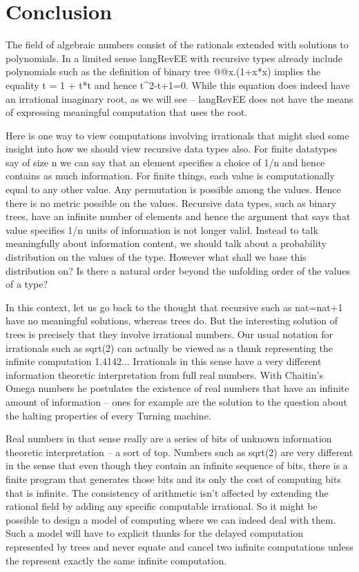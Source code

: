 \documentclass[preprint]{sigplanconf}
\begin{document}
{%
\section{Conclusion}
\label{sec:conc}

The field of algebraic numbers consist of the rationals extended with
solutions to polynomials. In a limited sense {{langRevEE}} with
recursive types already include polynomials such as the definition of
binary tree {{@@x.(1+x*x)}} implies the equality {{t = 1 + t*t}} and
hence {{t^2-t+1=0}}. While this equation does indeed have an
irrational imaginary root, as we will see -- {{langRevEE}} does not
have the means of expressing meaningful computation that uses the
root.

Here is one way to view computations involving irrationals that might
shed some insight into how we should view recursive data types
also. For finite datatypes say of size {{n}} we can say that an
element specifies a choice of {{1/n}} and hence contains as much
information. For finite things, each value is computationally equal to
any other value. Any permutation is possible among the values. Hence
there is no metric possible on the values.  Recursive data types, such
as binary trees, have an infinite number of elements and hence the
argument that says that value specifies {{1/n}} units of information
is not longer valid. Instead to talk meaningfully about information
content, we should talk about a probability distribution on the values
of the type. However what shall we base this distribution on? Is there
a natural order beyond the unfolding order of the values of a type? 

In this context, let us go back to the thought that recursive such as
{{nat=nat+1}} have no meaningful solutions, whereas trees do. But the
interesting solution of trees is precisely that they involve
irrational numbers. Our usual notation for irrationals such as
{{sqrt(2) }} can actually be viewed as a thunk representing the
infinite computation {{1.4142..}}. Irrationals in this sense have a
very different information theoretic interpretation from full real
numbers. With Chaitin's Omega numbers he postulates the existence of
real numbers that have an infinite amount of information -- ones for
example are the solution to the question about the halting properties
of every Turning machine. 

Real numbers in that sense really are a series of bits of unknown
information theoretic interpretation -- a sort of {{top}}. Numbers
such as {{sqrt(2) }} are very different in the sense that even though
they contain an infinite sequence of bits, there is a finite program
that generates those bits and its only the cost of computing bits that
is infinite.  The consistency of arithmetic isn't affected by
extending the rational field by adding any specific computable
irrational. So it might be possible to design a model of computing
where we can indeed deal with them. Such a model will have to explicit
thunks for the delayed computation represented by trees and never
equate and cancel two infinite computations unless the represent
exactly the same infinite computation.

}
\end{document}
